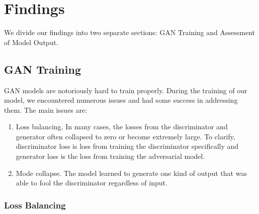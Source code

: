 \documentclass[12pt,oneside]{chicagocapstone}
\providecommand{\tightlist}{%
  \setlength{\itemsep}{0pt}\setlength{\parskip}{0pt}}
\begin{document}
\hypertarget{findings}{%
\chapter*{Findings}\label{findings}}

We divide our findings into two separate sections: GAN Training and Assessment of Model Output.

\hypertarget{findings-gan_training}{%
\section*{GAN Training}\label{findings-gan_training}}

GAN models are notoriously hard to train properly. During the training of our model, we encountered numerous issues and had some success in addressing them. The main issues are:
\begin{enumerate}
\def\labelenumi{\arabic{enumi}.}
\tightlist
\item
  Loss balancing. In many cases, the losses from the discriminator and generator often collapsed to zero or become extremely large. To clarify, discriminator loss is loss from training the discriminator specifically and generator loss is the loss from training the adversarial model.
\item
  Mode collapse. The model learned to generate one kind of output that was able to fool the discriminator regardless of input.
\end{enumerate}
\hypertarget{loss-balancing}{%
\subsection*{Loss Balancing}\label{loss-balancing}}
\end{document}
